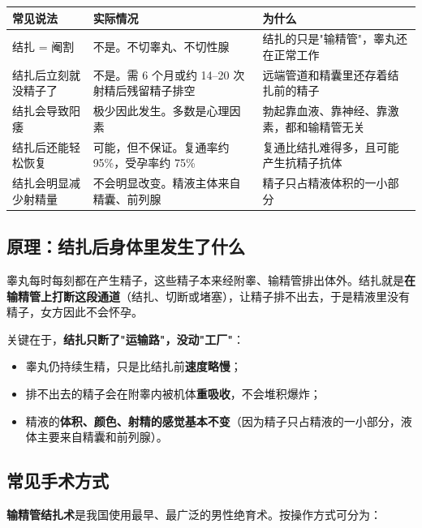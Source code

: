 \documentclass[12pt,UTF8,openany]{ctexbook}
\begin{document}
\begin{center}
\renewcommand{\arraystretch}{1.3}
\begin{tabularx}{\textwidth}{|X|X|X|}
\hline
\textbf{常见说法} & \textbf{实际情况} & \textbf{为什么} \\
\hline
结扎 = 阉割 & 不是。不切睾丸、不切性腺 & 结扎的只是"输精管"，睾丸还在正常工作 \\
结扎后立刻就没精子了 & 不是。需 6 个月或约 14–20 次射精后残留精子排空 & 远端管道和精囊里还存着结扎前的精子 \\
结扎会导致阳痿 & 极少因此发生。多数是心理因素 & 勃起靠血液、靠神经、靠激素，都和输精管无关 \\
结扎后还能轻松恢复 & 可能，但不保证。复通率约 95\%，受孕率约 75\% & 复通比结扎难得多，且可能产生抗精子抗体 \\
结扎会明显减少射精量 & 不会明显改变。精液主体来自精囊、前列腺 & 精子只占精液体积的一小部分 \\
\hline
\end{tabularx}
\end{center}

\subsection*{原理：结扎后身体里发生了什么}

睾丸每时每刻都在产生精子，这些精子本来经附睾、输精管排出体外。结扎就是\textbf{在输精管上打断这段通道}（结扎、切断或堵塞），让精子排不出去，于是精液里没有精子，女方因此不会怀孕。

关键在于，\textbf{结扎只断了"运输路"，没动"工厂"}：

\begin{itemize}
  \item 睾丸仍持续生精，只是比结扎前\textbf{速度略慢}；
  \item 排不出去的精子会在附睾内被机体\textbf{重吸收}，不会堆积爆炸；
  \item 精液的\textbf{体积、颜色、射精的感觉基本不变}（因为精子只占精液的一小部分，液体主要来自精囊和前列腺）。
\end{itemize}

\subsection*{常见手术方式}

\textbf{输精管结扎术}是我国使用最早、最广泛的男性绝育术。按操作方式可分为：
\end{document}
